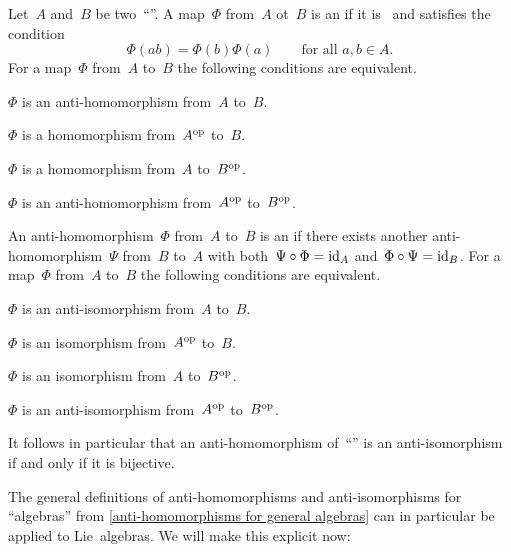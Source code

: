 \begin{recall}
	\label{anti-homomorphisms for general algebras}
	Let~$A$ and~$B$ be two~\enquote{\algebras{$\kf$}}.
	A map~$\Phi$ from~$A$ ot~$B$ is an  if it is~{\linear{$\kf$}} and satisfies the condition
	\[
		\Phi(ab)
		=
		\Phi(b) \Phi(a)
		\qquad
		\text{for all~$a, b \in A$.}
	\]
	For a map~$\Phi$ from~$A$ to~$B$ the following conditions are equivalent.
	\begin{equivalenceslist*}
		\item
			$\Phi$ is an anti-homomorphism from~$A$ to~$B$.
		\item
			$\Phi$ is a homomorphism from~$A^{\mathrm{op}}$ to~$B$.
		\item
			$\Phi$ is a homomorphism from~$A$ to~$B^{\mathrm{op}}$.
		\item
			$\Phi$ is an anti-homomorphism from~$A^{\mathrm{op}}$ to~$B^{\mathrm{op}}$.
	\end{equivalenceslist*}

	An anti-homomorphism~$\Phi$ from~$A$ to~$B$ is an  if there exists another anti-homomorphism~$\Psi$ from~$B$ to~$A$ with both~$\Psi \circ \Phi = \mathrm{id}_A$ and~$\Phi \circ \Psi = \mathrm{id}_B$.
	For a map~$\Phi$ from~$A$ to~$B$ the following conditions are equivalent.
	\begin{equivalenceslist*}
		\item
			$\Phi$ is an anti-isomorphism from~$A$ to~$B$.
		\item
			$\Phi$ is an isomorphism from~$A^{\mathrm{op}}$ to~$B$.
		\item
			$\Phi$ is an isomorphism from~$A$ to~$B^{\mathrm{op}}$.
		\item
			$\Phi$ is an anti-isomorphism from~$A^{\mathrm{op}}$ to~$B^{\mathrm{op}}$.
	\end{equivalenceslist*}

	It follows in particular that an anti-homomorphism of~\enquote{\algebras{$\kf$}} is an anti-isomorphism if and only if it is bijective.
\end{recall}


\begin{fluff}
	The general definitions of anti-homomorphisms and anti-isomorphisms for \enquote{algebras} from \cref{anti-homomorphisms for general algebras} can in particular be applied to Lie~algebras.
	We will make this explicit now:
\end{fluff}



